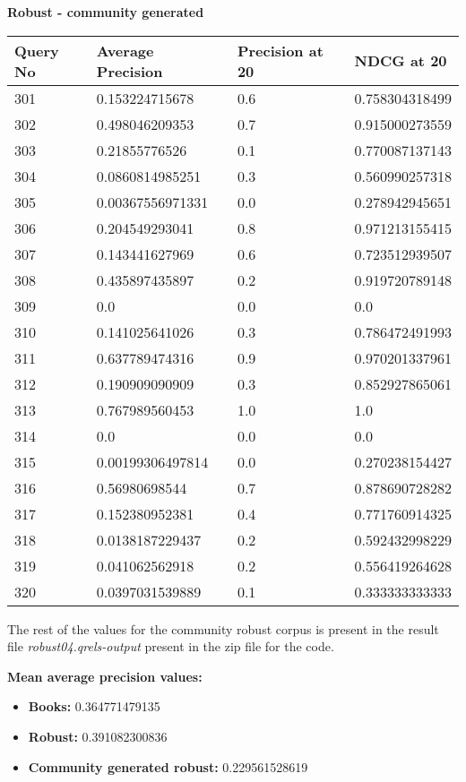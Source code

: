 \documentclass[12pt,letterpaper]{article}
\begin{document}
\pagebreak
\textbf{Robust - community generated}
\\
\begin{longtable}{| p{3.5cm} | p{3.5cm} | p{3.5cm} | p{3.5cm} |}
    \hline 
    Query No & Average Precision & Precision at 20 & NDCG at 20\\ \hline
    301 & 0.153224715678 & 0.6 & 0.758304318499\\
    302 & 0.498046209353 & 0.7 & 0.915000273559\\
    303 & 0.21855776526 & 0.1 & 0.770087137143\\
    304 & 0.0860814985251 & 0.3 & 0.560990257318\\
    305 & 0.00367556971331 & 0.0 & 0.278942945651\\
    306 & 0.204549293041 & 0.8 & 0.971213155415\\
    307 & 0.143441627969 & 0.6 & 0.723512939507\\
    308 & 0.435897435897 & 0.2 & 0.919720789148\\
    309 & 0.0 & 0.0 & 0.0\\
    310 & 0.141025641026 & 0.3 & 0.786472491993\\
    311 & 0.637789474316 & 0.9 & 0.970201337961\\
    312 & 0.190909090909 & 0.3 & 0.852927865061\\
    313 & 0.767989560453 & 1.0 & 1.0\\
    314 & 0.0 & 0.0 & 0.0\\
    315 & 0.00199306497814 & 0.0 & 0.270238154427\\
    316 & 0.56980698544 & 0.7 & 0.878690728282\\
    317 & 0.152380952381 & 0.4 & 0.771760914325\\
    318 & 0.0138187229437 & 0.2 & 0.592432998229\\
    319 & 0.041062562918 & 0.2 & 0.556419264628\\
    320 & 0.0397031539889 & 0.1 & 0.333333333333\\
    
    \hline
\end{longtable}
The rest of the values for the community robust corpus is present in the result file \textit{robust04.qrels-output} present in the zip file for the code.

\textbf{Mean average precision values: }
\begin{itemize}
\item \textbf{Books:} 0.364771479135
\item \textbf{Robust:} 0.391082300836
\item \textbf{Community generated robust:} 0.229561528619
\end{itemize}
\end{document}
